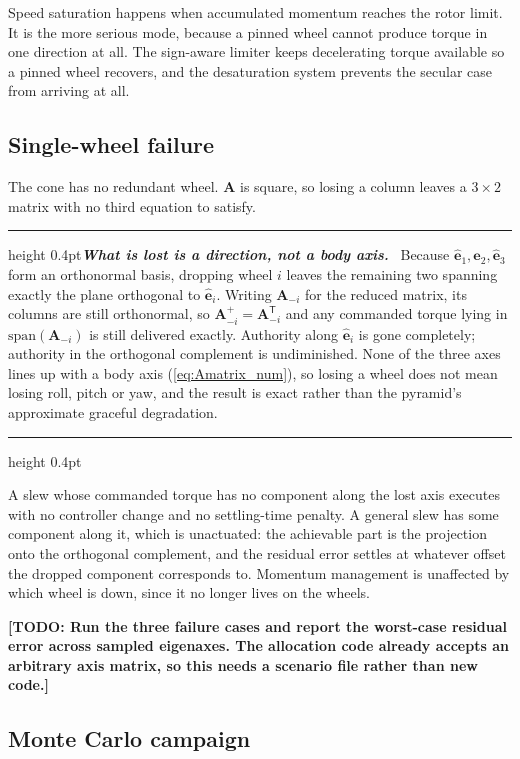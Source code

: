 \documentclass[conference,10pt,a4paper]{IEEEtran}
\newcommand{\remarkrule}{\par\nobreak\vspace{2pt}%
  \hrule height 0.4pt\vspace{4pt}\nobreak}
\newenvironment{keybox}[1][Result]
  {\par\medskip\remarkrule\noindent\small\textbf{\textit{#1.}}\ \ignorespaces}
  {\par\vspace{3pt}\hrule height 0.4pt\par\medskip\ignorespacesafterend}
\newcommand{\TODO}[1]{\textbf{[TODO: #1]}}
\newcommand{\TODO}[1]{}
\newcommand{\vect}[1]{\bm{#1}}
\newcommand{\mat}[1]{\bm{#1}}
\newcommand{\T}{^{\mathsf{T}}}
\newcommand{\pinv}{^{+}}
\begin{document}
Speed saturation happens when accumulated momentum reaches the rotor limit. It
is the more serious mode, because a pinned wheel cannot produce torque in one
direction at all. The sign-aware limiter keeps decelerating torque available so
a pinned wheel recovers, and the desaturation system prevents the secular case
from arriving at all.

\subsection{Single-wheel failure}
\label{sec:failure}

The cone has no redundant wheel. $\mat{A}$ is square, so losing a column leaves
a $3\times2$ matrix with no third equation to satisfy.

\begin{keybox}[What is lost is a direction, not a body axis]
Because $\hat{\vect{e}}_1,\hat{\vect{e}}_2,\hat{\vect{e}}_3$ form an
orthonormal basis, dropping wheel $i$ leaves the remaining two spanning exactly
the plane orthogonal to $\hat{\vect{e}}_i$. Writing $\mat{A}_{-i}$ for the
reduced matrix, its columns are still orthonormal, so
$\mat{A}_{-i}\pinv=\mat{A}_{-i}\T$ and any commanded torque lying in
$\mathrm{span}(\mat{A}_{-i})$ is still delivered exactly. Authority along
$\hat{\vect{e}}_i$ is gone completely; authority in the orthogonal complement
is undiminished. None of the three axes lines up with a body axis
(\cref{eq:Amatrix_num}), so losing a wheel does not mean losing roll, pitch or
yaw, and the result is exact rather than the pyramid's approximate graceful
degradation.
\end{keybox}

A slew whose commanded torque has no component along the lost axis executes
with no controller change and no settling-time penalty. A general slew has some
component along it, which is unactuated: the achievable part is the projection
onto the orthogonal complement, and the residual error settles at whatever
offset the dropped component corresponds to. Momentum management is unaffected
by which wheel is down, since it no longer lives on the wheels.

\TODO{Run the three failure cases and report the worst-case residual error
across sampled eigenaxes. The allocation code already accepts an arbitrary
axis matrix, so this needs a scenario file rather than new code.}

\subsection{Monte Carlo campaign}
\label{sec:montecarlo}
\end{document}
